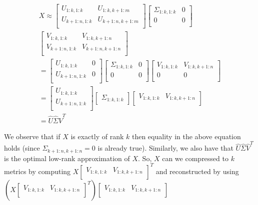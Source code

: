 \documentclass[conference]{IEEEtran}
\begin{document}
\begin{align*}
X \approx 
\begin{bmatrix}
U_{1:k,1:k} & U_{1:k,k+1:m} \\
U_{k+1:n,1:k} & U_{k+1:n,k+1:m} \\
\end{bmatrix}
\begin{bmatrix}
\Sigma_{1:k,1:k} & 0 \\
0 & 0 \\
\end{bmatrix}\\
\begin{bmatrix}
V_{1:k,1:k} & V_{1:k,k+1:n} \\
V_{k+1:n,1:k} & V_{k+1:n,k+1:n} \\
\end{bmatrix} \\
= 
\begin{bmatrix}
U_{1:k,1:k} & 0 \\
U_{k+1:n,1:k} & 0 \\
\end{bmatrix}
\begin{bmatrix}
\Sigma_{1:k,1:k} & 0 \\
0 & 0 \\
\end{bmatrix}
\begin{bmatrix}
V_{1:k,1:k} & V_{1:k,k+1:n} \\
0 & 0 \\
\end{bmatrix} \\
= 
\begin{bmatrix}
U_{1:k,1:k} \\
U_{k+1:n,1:k} \\
\end{bmatrix}
\begin{bmatrix}
\Sigma_{1:k,1:k}
\end{bmatrix}
\begin{bmatrix}
V_{1:k,1:k} & V_{1:k,k+1:n} \\
\end{bmatrix} \\
= \hat{U} \hat{\Sigma} \hat{V}^T
\end{align*}

We observe that if $X$ is exactly of rank $k$ then equality in the above equation holds (since $\Sigma_{k+1:n,k+1:n}=0$ is already true).  Similarly, we also have that $\hat{U} \hat{\Sigma} \hat{V}^T$ is the optimal low-rank approximation of $X$.  So, $X$ can we compressed to $k$ metrics by computing $X \begin{bmatrix} V_{1:k,1:k} & V_{1:k,k+1:n} \\ \end{bmatrix}^T$ and reconstructed by using $(X \begin{bmatrix} V_{1:k,1:k} & V_{1:k,k+1:n} \\ \end{bmatrix}^T) \begin{bmatrix} V_{1:k,1:k} & V_{1:k,k+1:n} \\ \end{bmatrix}$
\end{document}
